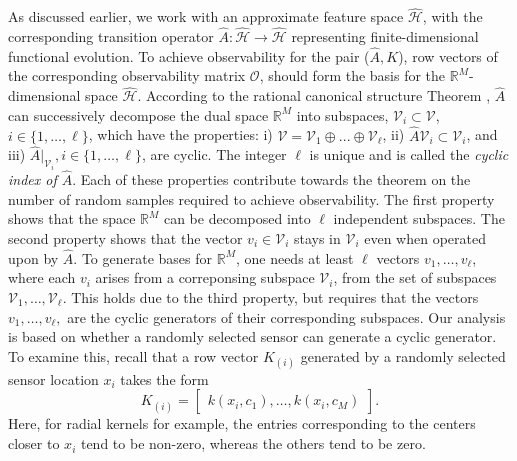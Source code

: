 \documentclass[letterpaper,12pt,peerreviewca,draftcls]{IEEEtran}
\newcommand{\bbm}{\begin{bmatrix}}
\newcommand{\ebm}{\end{bmatrix}}
\newcommand{\R}{\mathbb{R}}
\newcommand{\fspace}{\mathcal{H}}
\newcommand{\empK}{\ensuremath{K}}
\newcommand{\ncent}{M}
\newcommand{\Obs}{\mathcal{O}}
\newcommand{\fspaceApprox}{\widehat{\fspace}}
\newcommand{\linvec}{v}
\newcommand{\minmeas}{\ell}
\newcommand{\linspace}{\mathcal{V}}
\newcommand{\dualop}{A}
\newcommand{\dualopApprox}{\widehat{\dualop}}
\begin{document}
As discussed earlier, we work with an approximate feature space $ \fspaceApprox $, with the corresponding transition operator $ \dualopApprox: \fspaceApprox \rightarrow \fspaceApprox $ representing finite-dimensional functional evolution. To achieve observability for the pair ($ \dualopApprox , \empK $), row vectors of the corresponding observability matrix $ \Obs $, should form the basis for the $ \R^\ncent $-dimensional space $ \fspaceApprox $. According to the rational canonical structure Theorem \cite{wonham1974linear}, $\dualopApprox$ can successively decompose the dual space $ \R^\ncent $ into subspaces, $\linspace_i \subset \linspace$, $i\in \{1,\dots,\minmeas\}$, which have the properties: i) $\linspace = \linspace_1 \oplus ... \oplus \linspace_{\minmeas}$, ii) $\dualopApprox\linspace_i \subset \linspace_i$, and iii) $\dualopApprox|_{\linspace_i}, i \in \{1,\dots,\minmeas\}$, are cyclic. The integer $\minmeas$ is unique and is called the \emph{cyclic index of $\dualopApprox$}.  Each of these properties contribute towards the theorem on the number of random samples required to achieve observability. The first property shows that the space $ \R^\ncent $ can be decomposed into $ \ell $ independent subspaces. The second property shows that the vector $ \linvec_i \in \linspace_i $ stays in $ \linspace_i $ even when operated upon by $ \dualopApprox $. To generate bases for $ \R^\ncent $, one needs at least $ \ell $ vectors $ \linvec_1, \dots,\linvec_\ell $, where each $\linvec_i$ arises from a correponsing subspace $\linspace_i$, from the set of subspaces $ \linspace_1,\dots,\linspace_\ell $. This holds due to the third property, but requires that the vectors  $ \linvec_1, \dots,\linvec_\ell, $ are the cyclic generators of their corresponding subspaces. Our analysis is based on whether a randomly selected sensor can generate a cyclic generator. To examine this, recall that a row vector $ \empK_{(i)} $ generated by a randomly selected sensor location $ x_i $ takes the form
\begin{equation}\label{eq:rowvec}
\empK_{(i)} = \bbm k(x_i,c_1),\dots,k(x_i,c_\ncent) \ebm.
\end{equation}
Here, for radial kernels for example, the entries corresponding to the centers closer to $ x_i $ tend to be non-zero, whereas the others tend to be zero.  
\end{document}
